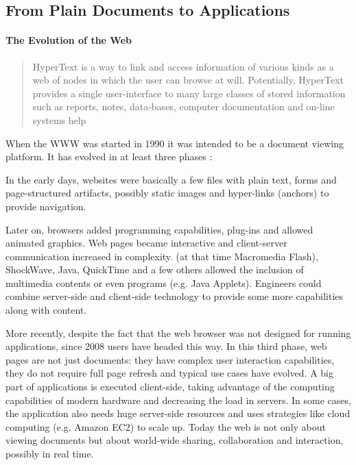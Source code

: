 
%
%

\subsection{From Plain Documents to Applications}
\paragraph{The Evolution of the Web}
\begin{quote} 
HyperText is a way to link and access information of various kinds as a web of nodes in which the user can browse at will. 
Potentially, HyperText provides a single user-interface to many large classes of stored information such as reports, notes, data-bases, computer documentation and on-line systems help\cite{BernersLee:1990}
\end{quote} 

When the \ac{WWW} was started in 1990 it was intended to be a document viewing platform.
It has evolved in at least three phases \cite{Anttonen:2011} \cite{Taivalsaari:2008}:

In the early days, websites were basically a few files with plain text, forms and page-structured artifacts, possibly static images and hyper-links (anchors) to provide navigation. 

Later on, browsers added programming capabilities, plug-ins and allowed animated graphics. 
Web pages became interactive and client-server communication increased in complexity.
\flash (at that time Macromedia Flash), ShockWave, Java, QuickTime and a few others allowed the inclusion of multimedia contents or even programs (e.g. Java Applets).
Engineers could combine server-side and client-side technology to provide some more capabilities along with content.

More recently, despite the fact that the web browser was not designed for running applications, since 2008 users have headed this way. 
In this third phase, web pages are not just documents: they have complex user interaction capabilities, they do not require full page refresh and typical use cases have evolved. 
A big part of applications is executed client-side, taking advantage of the computing capabilities of modern hardware and decreasing the load in servers. 
In some cases, the application also needs huge server-side resources and uses strategies like cloud computing (e.g. Amazon EC2) to scale up.
Today the web is not only about viewing documents but about world-wide sharing, collaboration and interaction, possibly in real time. 


